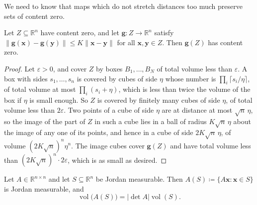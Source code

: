 We need to know that maps which do not stretch distances too much preserve sets of content zero.

\begin{lemma}
\label{lem:lipschitz-content}
Let $Z\subseteq\mathbb R^n$ have content zero, and let $\mathbf g\colon Z\to\mathbb R^n$ satisfy $\|\mathbf g(\mathbf x)-\mathbf g(\mathbf y)\|\le K\|\mathbf x-\mathbf y\|$ for all $\mathbf x,\mathbf y\in Z$. Then $\mathbf g(Z)$ has content zero.
\end{lemma}

\begin{proof}
Let $\varepsilon>0$, and cover $Z$ by boxes $B_1,\ldots,B_N$ of total volume less than $\varepsilon$. A box with sides $s_1,\ldots,s_n$ is covered by cubes of side $\eta$ whose number is $\prod_i\lceil s_i/\eta\rceil$, of total volume at most $\prod_i(s_i+\eta)$, which is less than twice the volume of the box if $\eta$ is small enough. So $Z$ is covered by finitely many cubes of side $\eta$, of total volume less than $2\varepsilon$. Two points of a cube of side $\eta$ are at distance at most $\sqrt n\,\eta$, so the image of the part of $Z$ in such a cube lies in a ball of radius $K\sqrt n\,\eta$ about the image of any one of its points, and hence in a cube of side $2K\sqrt n\,\eta$, of volume $(2K\sqrt n)^n\eta^n$. The image cubes cover $\mathbf g(Z)$ and have total volume less than $(2K\sqrt n)^n\cdot2\varepsilon$, which is as small as desired.
\end{proof}

\begin{theorem}
\label{thm:linear-volume}
Let $A\in\mathbb R^{n\times n}$ and let $S\subseteq\mathbb R^n$ be Jordan measurable. Then $A(S)\coloneqq\{A\mathbf x: \mathbf x\in S\}$ is Jordan measurable, and
\[
\operatorname{vol}\bigl(A(S)\bigr)=|\det A|\operatorname{vol}(S).
\]
\end{theorem}

